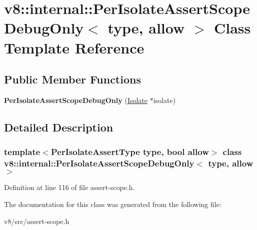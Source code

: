 \hypertarget{classv8_1_1internal_1_1PerIsolateAssertScopeDebugOnly}{}\section{v8\+:\+:internal\+:\+:Per\+Isolate\+Assert\+Scope\+Debug\+Only$<$ type, allow $>$ Class Template Reference}
\label{classv8_1_1internal_1_1PerIsolateAssertScopeDebugOnly}
\subsection*{Public Member Functions}
\begin{DoxyCompactItemize}
\item 
\mbox{\label{classv8_1_1internal_1_1PerIsolateAssertScopeDebugOnly_a51539975c189358a1eb6c6f3539945cb}} 
{\bfseries Per\+Isolate\+Assert\+Scope\+Debug\+Only} (\mbox{\hyperlink{classv8_1_1internal_1_1Isolate}{Isolate}} $\ast$isolate)
\end{DoxyCompactItemize}


\subsection{Detailed Description}
\subsubsection*{template$<$Per\+Isolate\+Assert\+Type type, bool allow$>$\newline
class v8\+::internal\+::\+Per\+Isolate\+Assert\+Scope\+Debug\+Only$<$ type, allow $>$}



Definition at line 116 of file assert-\/scope.\+h.



The documentation for this class was generated from the following file\+:\begin{DoxyCompactItemize}
\item 
v8/src/assert-\/scope.\+h\end{DoxyCompactItemize}
